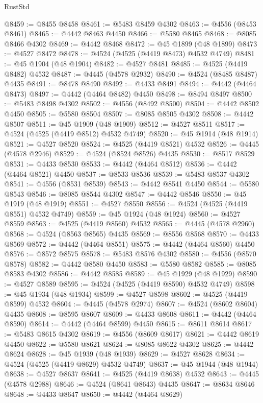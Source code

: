 \begin{lexlean}{RustStd}
\begin{coremodule}
@8459 := @8455 @8458
@8461 := @5483 @8459 @4302
@8463 := @4556 (@8453 @8461)
@8465 := @4442 @8463 @4450
@8466 := @5580 @8465
@8468 := @8085 @8466 @4302
@8469 := @4442 @8468
@8472 := @45 @1899 (@48 @1899)
@8473 := @4527 @8472
@8478 := @4524 (@4525 (@4419 @8473) @4532 @4749)
@8481 := @45 @1904 (@48 @1904)
@8482 := @4527 @8481
@8485 := @4525 (@4419 @8482) @4532
@8487 := @4445 (@4578 @2932)
@8490 := @4524 (@8485 @8487) @4435
@8491 := @8478 @8490
@8492 := @4433 @8491
@8494 := @4442 (@4464 @8473)
@8497 := @4442 (@4464 @8482) @4450
@8498 := @8494 @8497
@8500 := @5483 @8498 @4302
@8502 := @4556 (@8492 @8500)
@8504 := @4442 @8502 @4450
@8505 := @5580 @8504
@8507 := @8085 @8505 @4302
@8508 := @4442 @8507
@8511 := @45 @1909 (@48 @1909)
@8512 := @4527 @8511
@8517 := @4524 (@4525 (@4419 @8512) @4532 @4749)
@8520 := @45 @1914 (@48 @1914)
@8521 := @4527 @8520
@8524 := @4525 (@4419 @8521) @4532
@8526 := @4445 (@4578 @2946)
@8529 := @4524 (@8524 @8526) @4435
@8530 := @8517 @8529
@8531 := @4433 @8530
@8533 := @4442 (@4464 @8512)
@8536 := @4442 (@4464 @8521) @4450
@8537 := @8533 @8536
@8539 := @5483 @8537 @4302
@8541 := @4556 (@8531 @8539)
@8543 := @4442 @8541 @4450
@8544 := @5580 @8543
@8546 := @8085 @8544 @4302
@8547 := @4442 @8546
@8550 := @45 @1919 (@48 @1919)
@8551 := @4527 @8550
@8556 := @4524 (@4525 (@4419 @8551) @4532 @4749)
@8559 := @45 @1924 (@48 @1924)
@8560 := @4527 @8559
@8563 := @4525 (@4419 @8560) @4532
@8565 := @4445 (@4578 @2960)
@8568 := @4524 (@8563 @8565) @4435
@8569 := @8556 @8568
@8570 := @4433 @8569
@8572 := @4442 (@4464 @8551)
@8575 := @4442 (@4464 @8560) @4450
@8576 := @8572 @8575
@8578 := @5483 @8576 @4302
@8580 := @4556 (@8570 @8578)
@8582 := @4442 @8580 @4450
@8583 := @5580 @8582
@8585 := @8085 @8583 @4302
@8586 := @4442 @8585
@8589 := @45 @1929 (@48 @1929)
@8590 := @4527 @8589
@8595 := @4524 (@4525 (@4419 @8590) @4532 @4749)
@8598 := @45 @1934 (@48 @1934)
@8599 := @4527 @8598
@8602 := @4525 (@4419 @8599) @4532
@8604 := @4445 (@4578 @2974)
@8607 := @4524 (@8602 @8604) @4435
@8608 := @8595 @8607
@8609 := @4433 @8608
@8611 := @4442 (@4464 @8590)
@8614 := @4442 (@4464 @8599) @4450
@8615 := @8611 @8614
@8617 := @5483 @8615 @4302
@8619 := @4556 (@8609 @8617)
@8621 := @4442 @8619 @4450
@8622 := @5580 @8621
@8624 := @8085 @8622 @4302
@8625 := @4442 @8624
@8628 := @45 @1939 (@48 @1939)
@8629 := @4527 @8628
@8634 := @4524 (@4525 (@4419 @8629) @4532 @4749)
@8637 := @45 @1944 (@48 @1944)
@8638 := @4527 @8637
@8641 := @4525 (@4419 @8638) @4532
@8643 := @4445 (@4578 @2988)
@8646 := @4524 (@8641 @8643) @4435
@8647 := @8634 @8646
@8648 := @4433 @8647
@8650 := @4442 (@4464 @8629)

\end{coremodule}
\end{lexlean}
